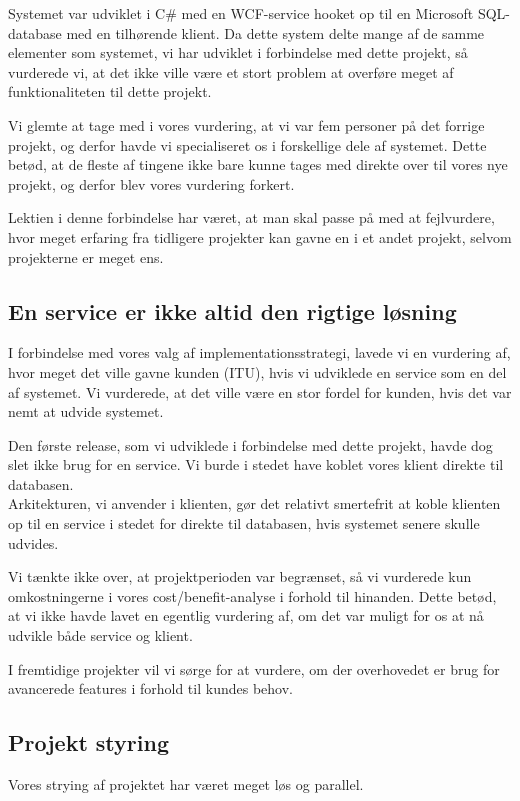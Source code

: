 Systemet var udviklet i C\# med en WCF-service hooket op til en Microsoft SQL-database med en tilhørende klient. Da dette system delte mange af de samme elementer som systemet, vi har udviklet i forbindelse med dette projekt, så vurderede vi, at det ikke ville være et stort problem at overføre meget af funktionaliteten til dette projekt.

Vi glemte at tage med i vores vurdering, at vi var fem personer på det forrige projekt, og derfor havde vi specialiseret os i forskellige dele af systemet. Dette betød, at de fleste af tingene ikke bare kunne tages med direkte over til vores nye projekt, og derfor blev vores vurdering forkert.

Lektien i denne forbindelse har været, at man skal passe på med at fejlvurdere, hvor meget erfaring fra tidligere projekter kan gavne en i et andet projekt, selvom projekterne er meget ens.

\subsection{En service er ikke altid den rigtige løsning}
\label{Conclusion_Lessons_Service}
I forbindelse med vores valg af implementationsstrategi, lavede vi en vurdering af, hvor meget det ville gavne kunden (ITU), hvis vi udviklede en service som en del af systemet. Vi vurderede, at det ville være en stor fordel for kunden, hvis det var nemt at udvide systemet.

Den første release, som vi udviklede i forbindelse med dette projekt, havde dog slet ikke brug for en service. Vi burde i stedet have koblet vores klient direkte til databasen. 
\\Arkitekturen, vi anvender i klienten, gør det relativt smertefrit at koble klienten op til en service i stedet for direkte til databasen, hvis systemet senere skulle udvides.

Vi tænkte ikke over, at projektperioden var begrænset, så vi vurderede kun omkostningerne i vores cost/benefit-analyse i forhold til hinanden. Dette betød, at vi ikke havde lavet en egentlig vurdering af, om det var muligt for os at nå udvikle både service og klient.

I fremtidige projekter vil vi sørge for at vurdere, om der overhovedet er brug for avancerede features i forhold til kundes behov.

\subsection{Projekt styring}
\label{Conclusion_Lessons_Styring}
Vores strying af projektet har været meget løs og parallel. 

